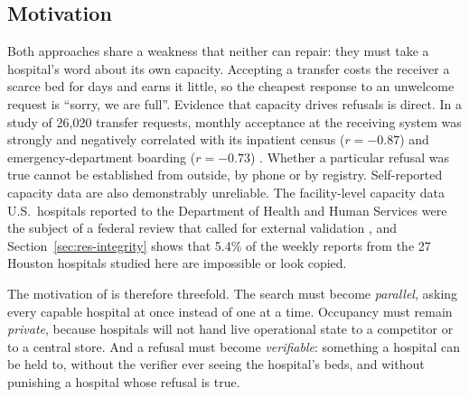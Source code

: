 \subsection{Motivation}
Both approaches share a weakness that neither can repair: they must take a hospital's word about its own capacity. Accepting a transfer costs the receiver a scarce bed for days and earns it little, so the cheapest response to an unwelcome request is ``sorry, we are full''. Evidence that capacity drives refusals is direct. In a study of 26,020 transfer requests, monthly acceptance at the receiving system was strongly and negatively correlated with its inpatient census ($r=-0.87$) and emergency-department boarding ($r=-0.73$) \cite{greenwood2025boarding}. Whether a particular refusal was true cannot be established from outside, by phone or by registry. Self-reported capacity data are also demonstrably unreliable. The facility-level capacity data U.S.\ hospitals reported to the Department of Health and Human Services were the subject of a federal review that called for external validation \cite{gao2021capacity}, and Section~\ref{sec:res-integrity} shows that 5.4\% of the weekly reports from the 27 Houston hospitals studied here are impossible or look copied.

The motivation of \mahros{} is therefore threefold. The search must become \emph{parallel}, asking every capable hospital at once instead of one at a time. Occupancy must remain \emph{private}, because hospitals will not hand live operational state to a competitor or to a central store. And a refusal must become \emph{verifiable}: something a hospital can be held to, without the verifier ever seeing the hospital's beds, and without punishing a hospital whose refusal is true.

